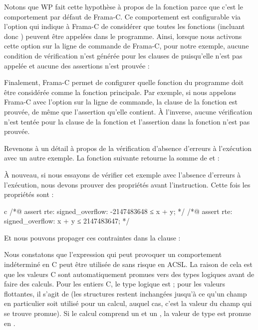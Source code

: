 

Notons que WP fait cette hypothèse à propos de la fonction 
parce que c'est le comportement par défaut de Frama-C. Ce comportement
est configurable via l'option  qui indique à Frama-C de
considérer que toutes les fonctions (incluant donc ) peuvent
être appelées dans le programme. Ainsi, lorsque nous activons cette option sur la
ligne de commande de Frama-C, pour notre exemple, aucune condition de
vérification n'est générée pour les clauses  de
 puisqu'elle n'est pas appelée et aucune des assertions n'est
prouvée :




Finalement, Frama-C permet de configurer quelle fonction du programme doit être
considérée comme la fonction principale. Par exemple, si nous appelons Frama-C
avec l'option  sur la ligne de commande, la clause
 de la fonction  est prouvée, de même que
l'assertion qu'elle contient. À l'inverse, aucune vérification n'est tentée
pour la clause  de la fonction  et
l'assertion dans la fonction  n'est pas prouvée.






Revenons à un détail à propos de la vérification d'absence d'erreurs à
l'exécution avec un autre exemple. La fonction suivante retourne la somme de
 et  :




À nouveau, si nous essayons de vérifier cet exemple avec l'absence d'erreurs à
l'exécution, nous devons prouver des propriétés avant l'instruction. Cette fois
les propriétés sont :


\begin{CodeBlock}{c}
/*@ assert rte: signed_overflow: -2147483648 ≤ x + y; */
/*@ assert rte: signed_overflow: x + y ≤ 2147483647; */
\end{CodeBlock}


Et nous pouvons propager ces contraintes dans la clause  :




Nous constatons que l'expression qui peut provoquer un comportement indéterminé en
C peut être utilisée de sans risque en ACSL. La raison de cela est que les
valeurs C sont automatiquement promues vers des types logiques avant de faire des
calculs. Pour les entiers C, le type logique est  ; pour les
valeurs flottantes, il s'agit de  (les structures restent
inchangées jusqu'à ce qu'un champ en particulier soit utilisé
pour un calcul, auquel cas, c'est la valeur du champ qui se trouve promue). Si
le calcul comprend un  et un , la valeur
de type  est promue en .


